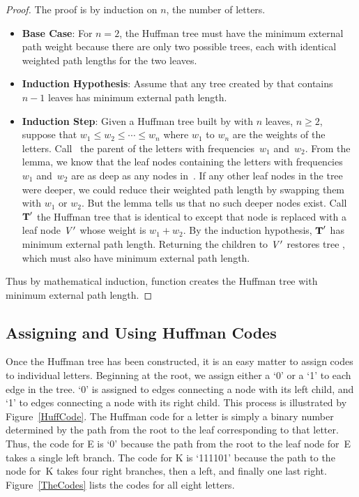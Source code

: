 \begin{proof}
The proof is by induction on \(n\), the number of letters.

\begin{itemize}

\item
{\bf Base Case}: For \(n = 2\), the Huffman tree must have the
minimum external path weight because there are only two possible trees,
each with identical weighted path lengths for the two leaves.

\item
{\bf Induction Hypothesis}: Assume that any tree created by
 that contains \(n-1\) leaves has minimum external path
length.

\item
{\bf Induction Step}: Given a Huffman tree  built by
 with \(n\) leaves,
\(n \geq 2\), suppose that \(w_1 \leq w_2 \leq \cdots \leq w_n\) where
\(w_1\) to \(w_n\) are the weights of the letters.
Call~ the parent of the letters with frequencies~\(w_1\)
and~\(w_2\).
From the lemma, we know that the leaf nodes containing the letters
with frequencies~\(w_1\) and~\(w_2\) are as deep as any nodes
in~.
If any other leaf nodes in the tree were deeper, we could reduce their 
weighted path length by swapping them with \(w_1\) or \(w_2\).
But the lemma tells us that no such deeper nodes exist.
Call \({\textbf{T}}'\) the Huffman tree that is identical to  except
that node  is replaced with a leaf node \({\textit{V}}\,'\) whose
weight is \(w_1 + w_2\).
By the induction hypothesis, \({\textbf{T}}'\) has minimum external path
length.
Returning the children to \({\textit{V}}\,'\) restores tree , which
must also have minimum external path length.
\end{itemize}

Thus by mathematical induction, function  creates the
Huffman tree with minimum external path length.
\end{proof}

\subsection{Assigning and Using Huffman Codes}

Once the Huffman tree has been constructed, it is an easy
matter to assign codes to individual letters.
Beginning at the root, we assign either a `0' or a `1' to each edge in
the tree.
`0' is assigned to edges connecting a node with its left child,
and `1' to edges connecting a node with its right child.
This process is illustrated by  Figure~\ref{HuffCode}.
The Huffman code for a letter is simply a binary number determined by
the path from the root to the leaf corresponding to that letter.
Thus, the code for E is `0' because the path
from the root to the leaf node for~E takes a single left branch.
The code for K is `111101' because the path to the node for~K
takes four right branches, then a left, and finally one last right.
Figure~\ref{TheCodes} lists the codes for all eight letters.

